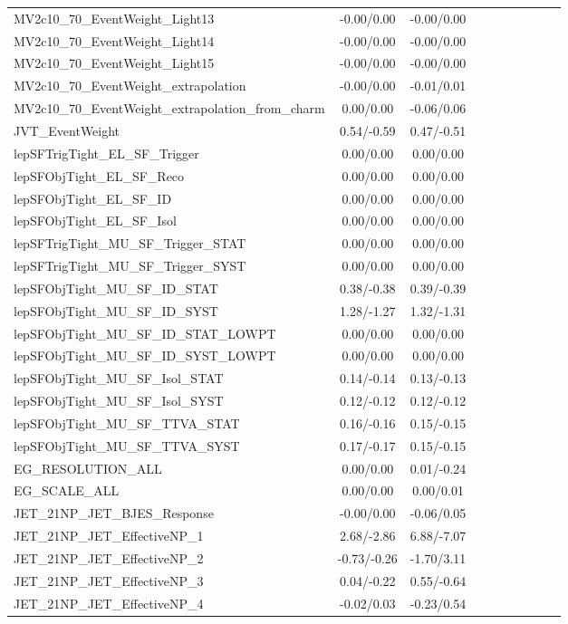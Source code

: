 \begin{table}[h]
\begin{center}
\begin{tabular}{l|ccccccccc}
MV2c10\_70\_EventWeight\_Light13 &-0.00/0.00 &-0.00/0.00 \\
MV2c10\_70\_EventWeight\_Light14 &-0.00/0.00 &-0.00/0.00 \\
MV2c10\_70\_EventWeight\_Light15 &-0.00/0.00 &-0.00/0.00 \\
MV2c10\_70\_EventWeight\_extrapolation &-0.00/0.00 &-0.01/0.01 \\
MV2c10\_70\_EventWeight\_extrapolation\_from\_charm &0.00/0.00 &-0.06/0.06 \\
JVT\_EventWeight &0.54/-0.59 &0.47/-0.51 \\
lepSFTrigTight\_EL\_SF\_Trigger &0.00/0.00 &0.00/0.00 \\
lepSFObjTight\_EL\_SF\_Reco &0.00/0.00 &0.00/0.00 \\
lepSFObjTight\_EL\_SF\_ID &0.00/0.00 &0.00/0.00 \\
lepSFObjTight\_EL\_SF\_Isol &0.00/0.00 &0.00/0.00 \\
lepSFTrigTight\_MU\_SF\_Trigger\_STAT &0.00/0.00 &0.00/0.00 \\
lepSFTrigTight\_MU\_SF\_Trigger\_SYST &0.00/0.00 &0.00/0.00 \\
lepSFObjTight\_MU\_SF\_ID\_STAT &0.38/-0.38 &0.39/-0.39 \\
lepSFObjTight\_MU\_SF\_ID\_SYST &1.28/-1.27 &1.32/-1.31 \\
lepSFObjTight\_MU\_SF\_ID\_STAT\_LOWPT &0.00/0.00 &0.00/0.00 \\
lepSFObjTight\_MU\_SF\_ID\_SYST\_LOWPT &0.00/0.00 &0.00/0.00 \\
lepSFObjTight\_MU\_SF\_Isol\_STAT &0.14/-0.14 &0.13/-0.13 \\
lepSFObjTight\_MU\_SF\_Isol\_SYST &0.12/-0.12 &0.12/-0.12 \\
lepSFObjTight\_MU\_SF\_TTVA\_STAT &0.16/-0.16 &0.15/-0.15 \\
lepSFObjTight\_MU\_SF\_TTVA\_SYST &0.17/-0.17 &0.15/-0.15 \\
EG\_RESOLUTION\_ALL &0.00/0.00 &0.01/-0.24 \\
EG\_SCALE\_ALL &0.00/0.00 &0.00/0.01 \\
JET\_21NP\_JET\_BJES\_Response &-0.00/0.00 &-0.06/0.05 \\
JET\_21NP\_JET\_EffectiveNP\_1 &2.68/-2.86 &6.88/-7.07 \\
JET\_21NP\_JET\_EffectiveNP\_2 &-0.73/-0.26 &-1.70/3.11 \\
JET\_21NP\_JET\_EffectiveNP\_3 &0.04/-0.22 &0.55/-0.64 \\
JET\_21NP\_JET\_EffectiveNP\_4 &-0.02/0.03 &-0.23/0.54 \\

\end{tabular}
\end{center}
\end{table}
